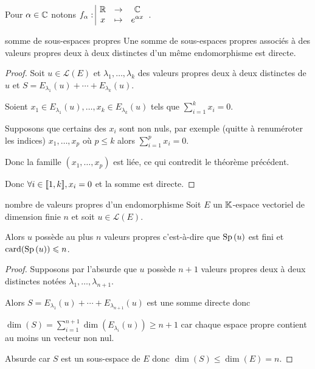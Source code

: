 \begin{exemple}
    Pour $\alpha \in \mathbb{C}$ notons $f_\alpha: \space \begin{array}{|ccc} \displaystyle \mathbb{R} & \to & \displaystyle \mathbb{C} \\ \displaystyle x & \mapsto & \displaystyle e^{\alpha x} \end{array}$.
\end{exemple}

\begin{theoreme}{somme de sous-espaces propres}{}
    Une somme de sous-espaces propres associés à des valeurs propres deux à deux distinctes 
    d'un même endomorphisme est directe. 
\end{theoreme}


\begin{proof}
    Soit $u \in \mathscr L(E)$ et $\lambda_1, \ldots, \lambda_k$ des valeurs propres deux à deux distinctes de $u$
    et $S = E_{\lambda_1}(u) + \cdots + E_{\lambda_k}(u)$.

    Soient $x_1 \in E_{\lambda_1}(u), \ldots, x_k \in E_{\lambda_k}(u)$ tels que
    $\displaystyle \sum_{i = 1}^k x_i = 0$.

    Supposons que certains des $x_i$ sont non nuls, par exemple (quitte à renuméroter les indices)
    $x_1, \dots, x_p$ où $p \leqslant k$ alors $\displaystyle \sum_{i = 1}^p x_i = 0$.

    Donc la famille $(x_1, \ldots, x_p)$ est liée, ce qui contredit le théorème précédent. 

    Donc $\forall i \in [\![1, k]\!], x_i = 0$ et la somme est directe.
\end{proof}

\begin{theoreme}{nombre de valeurs propres d'un endomorphisme}{}
    Soit $E$ un $\mathbb{K}$-espace vectoriel de dimension finie $n$ et soit $u \in \mathscr L(E)$.

    Alors $u$ possède au plus $n$ valeurs propres c'est-à-dire que $\operatorname{Sp} \,(u)$ est fini et 
    $\operatorname{card}(\operatorname{Sp} \,(u)) \leqslant n$.
\end{theoreme}


\begin{proof}
    Supposons par l'absurde que $u$ possède $n + 1$ valeurs propres deux à deux distinctes
    notées $\lambda_1, \ldots, \lambda_{n + 1}$.

    Alors $S = E_{\lambda_1}(u) + \cdots + E_{\lambda_{n + 1}}(u)$ est une somme directe
    donc 
    
    $\displaystyle \dim(S) = \sum_{i = 1}^{n + 1} \dim(E_{\lambda_i}(u)) \geqslant n + 1$ car
    chaque espace propre contient au moins un vecteur non nul.

    Absurde car $S$ est un sous-espace de $E$ donc $\dim(S) \leqslant \dim(E) = n$.
\end{proof}

